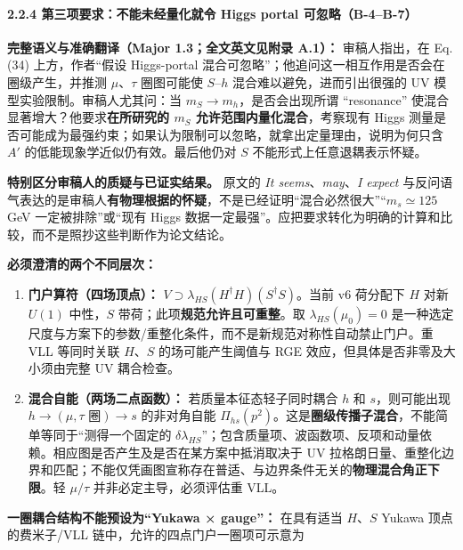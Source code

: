 \documentclass[
]{article}
\providecommand{\tightlist}{%
  \setlength{\itemsep}{0pt}\setlength{\parskip}{0pt}}
\begin{document}
\paragraph{2.2.4 第三项要求：不能未经量化就令 Higgs portal
可忽略（B-4--B-7）}\label{ux7b2cux4e09ux9879ux8981ux6c42ux4e0dux80fdux672aux7ecfux91cfux5316ux5c31ux4ee4-higgs-portal-ux53efux5ffdux7565b-4b-7}

\textbf{完整语义与准确翻译（Major 1.3；全文英文见附录 A.1）：}
审稿人指出，在 Eq. (34) 上方，作者``假设 Higgs-portal
混合可忽略''；他追问这一相互作用是否会在圈级产生，并推测
\(\mu\)、\(\tau\) 圈图可能使 \(S\)--\(h\) 混合难以避免，进而引出很强的
UV 模型实验限制。审稿人尤其问：当 \(m_S\to m_h\)，是否会出现所谓
``resonance'' 使混合显著增大？他要求\textbf{在所研究的 \(m_S\)
允许范围内量化混合}，考察现有 Higgs
测量是否可能成为最强约束；如果认为限制可以忽略，就拿出定量理由，说明为何只含
\(A'\) 的低能现象学近似仍有效。最后他仍对 \(S\)
不能形式上任意退耦表示怀疑。

\textbf{特别区分审稿人的质疑与已证实结果。} 原文的 \emph{It
seems}、\emph{may}、\emph{I expect}
与反问语气表达的是审稿人\textbf{有物理根据的怀疑}，不是已经证明``混合必然很大''``\(m_s\simeq125\)
GeV 一定被排除''或``现有 Higgs
数据一定最强''。应把要求转化为明确的计算和比较，而不是照抄这些判断作为论文结论。

\textbf{必须澄清的两个不同层次：}

\begin{enumerate}
\def\labelenumi{\arabic{enumi}.}
\tightlist
\item
  \textbf{门户算符（四场顶点）：}
  \(V\supset\lambda_{HS}(H^\dagger H)(S^\dagger S)\)。当前 v6 荷分配下
  \(H\) 对新 \(U(1)\) 中性，\(S\)
  带荷；此项\textbf{规范允许且可重整}。取 \(\lambda_{HS}(\mu_0)=0\)
  是一种选定尺度与方案下的参数/重整化条件，而不是新规范对称性自动禁止门户。重
  VLL 等同时关联 \(H\)、\(S\) 的场可能产生阈值与 RGE
  效应，但具体是否非零及大小须由完整 UV 耦合检查。
\item
  \textbf{混合自能（两场二点函数）：} 若质量本征态轻子同时耦合 \(h\) 和
  \(s\)，则可能出现 \(h\to(\mu,\tau\text{ 圈})\to s\) 的非对角自能
  \(\Pi_{hs}(p^2)\)。这是\textbf{圈级传播子混合}，不能简单等同于``测得一个固定的
  \(\delta\lambda_{HS}\)''；包含质量项、波函数项、反项和动量依赖。相应图是否产生及是否在某方案中抵消取决于
  UV
  拉格朗日量、重整化边界和匹配；不能仅凭画图宣称存在普适、与边界条件无关的\textbf{物理混合角正下限}。轻
  \(\mu/\tau\) 并非必定主导，必须评估重 VLL。
\end{enumerate}

\textbf{一圈耦合结构不能预设为``Yukawa × gauge''：} 在具有适当
\(H\)、\(S\) Yukawa 顶点的费米子/VLL 链中，允许的四点门户一圈项可示意为
\end{document}
